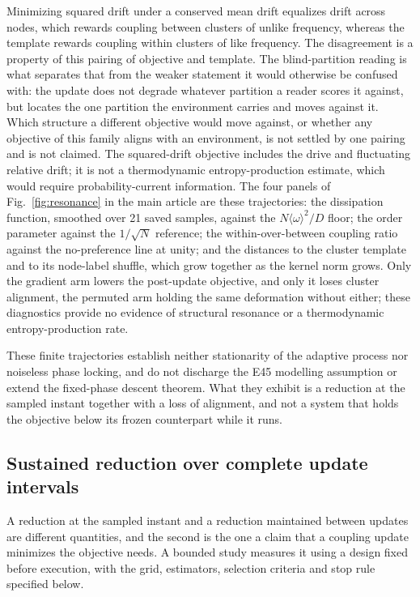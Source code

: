 \documentclass{article}
\begin{document}
Minimizing squared drift under a conserved mean drift equalizes drift across
nodes, which rewards coupling between clusters of unlike frequency, whereas the
template rewards coupling within clusters of like frequency. The disagreement is
a property of this pairing of objective and template. The blind-partition
reading is what separates that from the weaker statement it would otherwise be
confused with: the update does not degrade whatever partition a reader scores
it against, but locates the one partition the environment carries and moves
against it. Which structure a different objective would move against, or whether
any objective of this family aligns with an environment, is not settled by one
pairing and is not claimed. The squared-drift
objective includes the drive and fluctuating relative drift; it is not a
thermodynamic entropy-production estimate, which would require
probability-current information.
The four panels of Fig.~\ref{fig:resonance} in the main article are these
trajectories: the dissipation function, smoothed over 21 saved samples, against
the $N\langle\omega\rangle^2/D$ floor; the order parameter against the
$1/\sqrt{N}$ reference; the within-over-between coupling ratio against the
no-preference line at unity; and the distances to the cluster template and to its
node-label shuffle, which grow together as the kernel norm grows. Only the
gradient arm lowers the post-update objective, and only it loses cluster
alignment, the permuted arm holding the same deformation without either; these
diagnostics provide no evidence of structural resonance or a thermodynamic
entropy-production rate.

These finite trajectories establish neither stationarity of the adaptive
process nor noiseless phase locking, and do not discharge the E45 modelling
assumption or extend the fixed-phase descent theorem. What they exhibit is a
reduction at the sampled instant together with a loss of alignment, and not a
system that holds the objective below its frozen counterpart while it runs.

\subsection{Sustained reduction over complete update intervals}
\label{sec:plasticity-intervals}

A reduction at the sampled instant and a reduction maintained between updates
are different quantities, and the second is the one a claim that a coupling
update minimizes the objective needs. A bounded study measures it using a design
fixed before execution, with the grid, estimators, selection criteria and stop
rule specified below.
\end{document}
